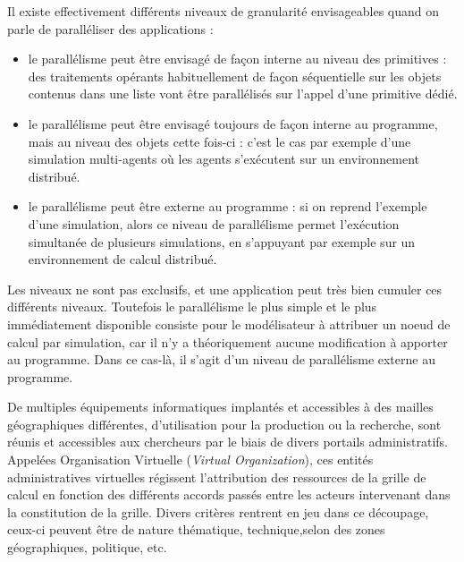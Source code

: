Il existe effectivement différents niveaux de granularité envisageables quand on parle de paralléliser des applications :
\begin{itemize}[label=\textbullet]
\item le parallélisme peut être envisagé de façon interne au niveau des primitives : des traitements opérants habituellement de façon séquentielle sur les objets contenus dans une liste vont être parallélisés sur l'appel d'une primitive dédié.
\item le parallélisme peut être envisagé toujours de façon interne au programme, mais au niveau des objets cette fois-ci : c'est le cas par exemple d'une simulation multi-agents où les agents s'exécutent sur un environnement distribué.
\item le parallélisme peut être externe au programme : si on reprend l'exemple d'une simulation, alors ce niveau de parallélisme permet l'exécution simultanée de plusieurs simulations, en s'appuyant par exemple sur un environnement de calcul distribué.
\end{itemize}

Les niveaux ne sont pas exclusifs, et une application peut très bien cumuler ces différents niveaux. Toutefois le parallélisme le plus simple et le plus immédiatement disponible consiste pour le modélisateur à attribuer un noeud de calcul par simulation, car il n'y a théoriquement aucune modification à apporter au programme. Dans ce cas-là, il s'agit d'un niveau de parallélisme externe au programme.

De multiples équipements informatiques implantés et accessibles à des mailles géographiques différentes, d'utilisation pour la production ou la recherche, sont réunis et accessibles aux chercheurs par le biais de divers portails administratifs. Appelées Organisation Virtuelle (\textit{Virtual Organization}), ces entités administratives virtuelles régissent l'attribution des ressources de la grille de calcul en fonction des différents accords passés entre les acteurs intervenant dans la constitution de la grille. Divers critères rentrent en jeu dans ce découpage, ceux-ci peuvent être de nature thématique, technique,selon des zones géographiques, politique, etc.

